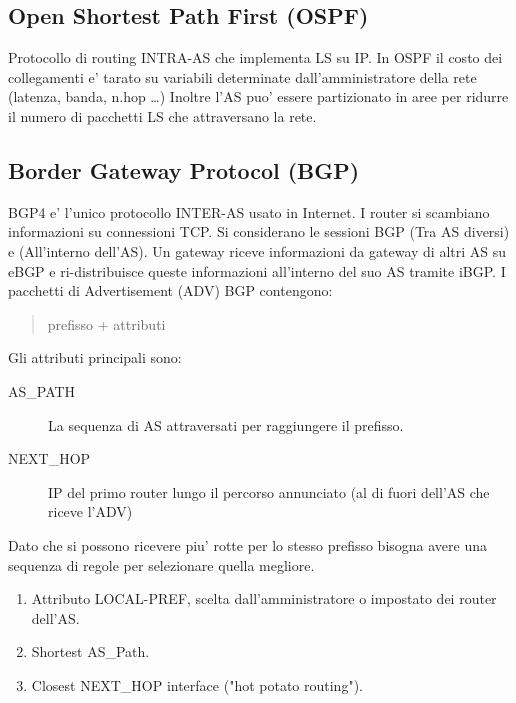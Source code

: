 \subsection{Open Shortest Path First (OSPF)}
Protocollo di routing INTRA-AS che implementa LS su IP.
In OSPF il costo dei collegamenti e' tarato su variabili determinate dall'amministratore della rete (latenza, banda, n.hop \dots)
Inoltre l'AS puo' essere partizionato in aree per ridurre il numero di pacchetti LS che attraversano la rete.
\subsection{Border Gateway Protocol (BGP)}
BGP4 e' l'unico protocollo INTER-AS usato in Internet.
I router si scambiano informazioni su connessioni TCP.
Si considerano le sessioni BGP  (Tra AS diversi) e  (All'interno dell'AS).
Un gateway riceve informazioni da gateway di altri AS su eBGP e ri-distribuisce queste informazioni all'interno del suo AS tramite iBGP.
I pacchetti di Advertisement (ADV) BGP contengono:
\begin{quote}
    prefisso + attributi
\end{quote}
Gli attributi principali sono:

\begin{description}
    \item[AS\_PATH] La sequenza di AS attraversati per raggiungere il prefisso.
    \item[NEXT\_HOP] IP del primo router lungo il percorso annunciato (al di fuori dell'AS che riceve l'ADV)
\end{description}

Dato che si possono ricevere piu' rotte per lo stesso prefisso bisogna avere una sequenza di regole per selezionare quella megliore.
\begin{enumerate}
    \item Attributo LOCAL-PREF, scelta dall'amministratore o impostato dei router dell'AS.
    \item Shortest AS\_Path.
    \item Closest NEXT\_HOP interface ("hot potato routing").
\end{enumerate}